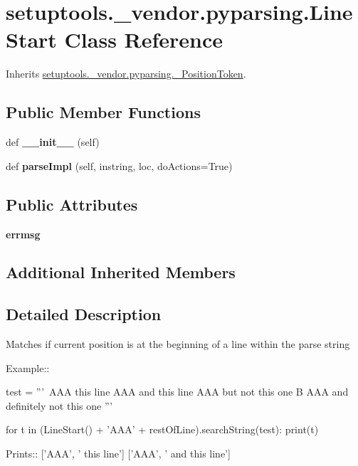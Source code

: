 \hypertarget{classsetuptools_1_1__vendor_1_1pyparsing_1_1_line_start}{}\section{setuptools.\+\_\+vendor.\+pyparsing.\+Line\+Start Class Reference}
\label{classsetuptools_1_1__vendor_1_1pyparsing_1_1_line_start}


Inherits \hyperlink{classsetuptools_1_1__vendor_1_1pyparsing_1_1___position_token}{setuptools.\+\_\+vendor.\+pyparsing.\+\_\+\+Position\+Token}.

\subsection*{Public Member Functions}
\begin{DoxyCompactItemize}
\item 
\mbox{\label{classsetuptools_1_1__vendor_1_1pyparsing_1_1_line_start_a674ad57fddb39ceb1c77560f7bb2844f}} 
def {\bfseries \+\_\+\+\_\+init\+\_\+\+\_\+} (self)
\item 
\mbox{\label{classsetuptools_1_1__vendor_1_1pyparsing_1_1_line_start_a263bb9c5972d8bb9097184c1a3879d0f}} 
def {\bfseries parse\+Impl} (self, instring, loc, do\+Actions=True)
\end{DoxyCompactItemize}
\subsection*{Public Attributes}
\begin{DoxyCompactItemize}
\item 
\mbox{\label{classsetuptools_1_1__vendor_1_1pyparsing_1_1_line_start_a24b64fc4f52322b55b5b9acaec9b3d87}} 
{\bfseries errmsg}
\end{DoxyCompactItemize}
\subsection*{Additional Inherited Members}


\subsection{Detailed Description}
\begin{DoxyVerb}Matches if current position is at the beginning of a line within the parse string

Example::

    test = '''\
    AAA this line
    AAA and this line
      AAA but not this one
    B AAA and definitely not this one
    '''

    for t in (LineStart() + 'AAA' + restOfLine).searchString(test):
        print(t)

Prints::
    ['AAA', ' this line']
    ['AAA', ' and this line']    \end{DoxyVerb}
 

